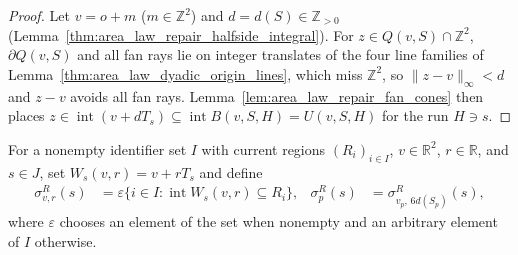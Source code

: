 \begin{proof}
    \leanok
    Let $v=o+m$ ($m\in\mathbb Z^2$) and $d=d(S)\in\mathbb Z_{>0}$
    (Lemma~\ref{thm:area_law_repair_halfside_integral}). For $z\in Q(v,S)\cap\mathbb Z^2$,
    $\partial Q(v,S)$ and all fan rays lie on integer translates of the four line families of
    Lemma~\ref{thm:area_law_dyadic_origin_lines}, which miss $\mathbb Z^2$, so $\|z-v\|_\infty<d$
    and $z-v$ avoids all fan rays. Lemma~\ref{lem:area_law_repair_fan_cones} then places
    $z\in\operatorname{int}(v+dT_s)\subseteq\operatorname{int}B(v,S,H)=U(v,S,H)$ for the run $H\ni s$.
\end{proof}

\begin{definition}
    \label{def:area_law_repair_current_assignment}
    \leanok
    For a nonempty identifier set $I$ with current regions $(R_i)_{i\in I}$, $v\in\mathbb R^2$,
    $r\in\mathbb R$, and $s\in J$, set $W_s(v,r)=v+rT_s$ and define
    \begin{align}
        \sigma^R_{v,r}(s)
         & =\varepsilon\{i\in I:\operatorname{int}W_s(v,r)\subseteq R_i\}, &
        \sigma^R_p(s)
         & =\sigma^R_{v_p,\,6d(S_p)}(s),
        \label{eq:area_law_repair_assignment}
    \end{align}
    where $\varepsilon$ chooses an element of the set when nonempty and an arbitrary element of $I$ otherwise.
\end{definition}

